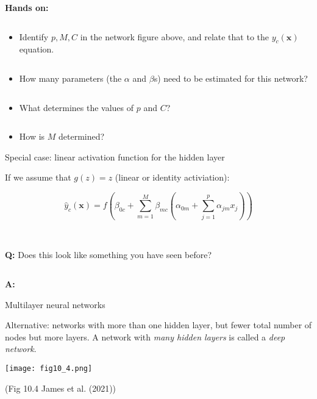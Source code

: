 \documentclass[
  10pt,
  ignorenonframetext,
]{beamer}
\providecommand{\tightlist}{%
  \setlength{\itemsep}{0pt}\setlength{\parskip}{0pt}}
\begin{document}
\begin{frame}
\textbf{Hands on:}

\(~\)

\begin{itemize}
\tightlist
\item
  Identify \(p, M, C\) in the network figure above, and relate that to
  the \(y_{c}({\boldsymbol x})\) equation.
\end{itemize}

\(~\)

\begin{itemize}
\tightlist
\item
  How many parameters (the \(\alpha\) and \(\beta\)s) need to be
  estimated for this network?
\end{itemize}

\(~\)

\begin{itemize}
\tightlist
\item
  What determines the values of \(p\) and \(C\)?
\end{itemize}

\(~\)

\begin{itemize}
\tightlist
\item
  How is \(M\) determined?
\end{itemize}
\end{frame}

\begin{frame}
\begin{block}{Special case: linear activation function for the hidden
layer}
\protect\hypertarget{special-case-linear-activation-function-for-the-hidden-layer}{}
\(~\)

If we assume that \(g(z)=z\) (linear or identity activiation):

\[
\hat{y}_c({\boldsymbol x})= f(\beta_{0c}+\sum_{m=1}^M \beta_{mc}(\alpha_{0m}+\sum_{j=1}^p \alpha_{jm}x_{j}))
\]

\(~\) \(~\)

\textbf{Q:} Does this look like something you have seen before?

\(~\)

\textbf{A:}
\end{block}
\end{frame}

\begin{frame}
\begin{block}{Multilayer neural networks}
\protect\hypertarget{multilayer-neural-networks}{}
\(~\)

Alternative: networks with more than one hidden layer, but fewer total
number of nodes but more layers. A network with \emph{many hidden
layers} is called a \emph{deep network}.

\centering

\texttt{[image: fig10\_4.png]}

\scriptsize

(Fig 10.4 James et al. (2021))
\end{block}
\end{frame}
\end{document}
